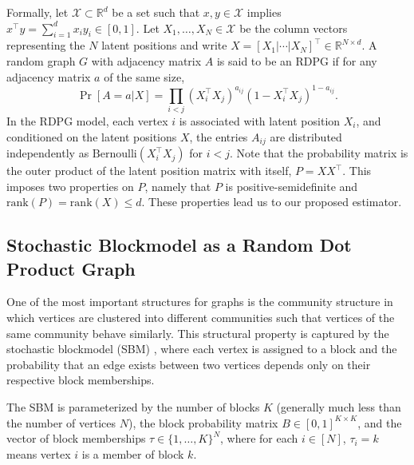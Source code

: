 \documentclass[10pt,letterpaper]{article}
\renewcommand{\Re}{\mathbb{R}}
\begin{document}
Formally, let $\mathcal{X} \subset \Re^d$ be a set such that $x, y \in \mathcal{X}$ implies $x^{\top} y =\sum_{i = 1}^d x_i y_i \in [0, 1]$.
Let $X_1,\dotsc,X_N\in \mathcal{X}$ be the column vectors representing the $N$ latent positions and write $X = [X_1|\cdots|X_N]^{\top} \in \Re^{N \times d}$.
A random graph $G$ with adjacency matrix $A$ is said to be an RDPG if for any adjacency matrix $a$ of the same size,
\[
    \Pr[A = a|X] = \prod_{i<j} (X_i^{\top} X_j)^{a_{ij}} ( 1 - X_i^{\top} X_j)^{1 - a_{ij}}.
\]
In the RDPG model, each vertex $i$ is associated with latent position $X_i$, and conditioned on the latent positions $X$, the entries $A_{ij}$ are distributed independently as $ \text{Bernoulli}(X_i^{\top} X_j)$ for $i<j$.
Note that the probability matrix is the outer product of the latent position matrix with itself, $P = X X^{\top}$.
This imposes two properties on $P$, namely that $P$ is positive-semidefinite and $\mathrm{rank}(P)=\mathrm{rank}(X)\leq d$.
These properties lead us to our proposed estimator.



\subsection{Stochastic Blockmodel as a Random Dot Product Graph}
\label{section:sbm_rdpg}
One of the most important structures for graphs is the community structure in which vertices are clustered into different communities such that vertices of the same community behave similarly. This structural property is captured by the stochastic blockmodel (SBM) \citep{holland1983stochastic}, where each vertex is assigned to a block and the probability that an edge exists between two vertices depends only on their respective block memberships.



The SBM is parameterized by the number of blocks $K$ (generally much less than the number of vertices $N$), the block probability matrix $B \in [0,1]^{K \times K}$, and the vector of block memberships
$\tau\in\{1,\dotsc,K\}^N$, where for each $i \in [N]$, $\tau_i = k$ means vertex $i$ is a member of block $k$.
\end{document}
